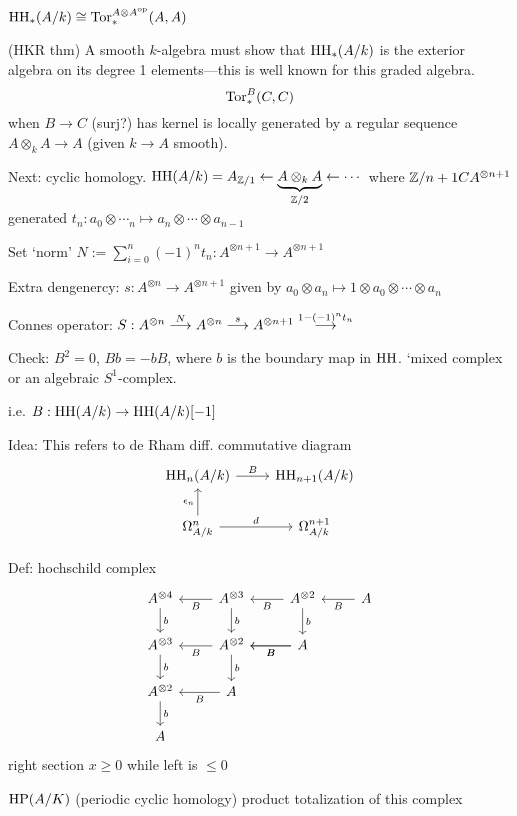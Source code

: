 \begin{cor}
$\operatorname{HH}_*(A/k) \cong \operatorname{Tor}_*^{A \otimes A^\text{op}}(A,A)$
\end{cor}



\pf (HKR thm) A smooth $k$-algebra must show that $\operatorname{HH}_*(A/k)$ is the exterior algebra on its degree 1 elements---this is well known for this graded algebra.
	\[
	\operatorname{Tor}_*^B(C,C)
	\]
when $B \to C$ (surj?) has kernel is locally generated by a regular sequence $A \otimes_k A \to A$ (given $k \to A$ smooth). 


Next: cyclic homology.
$\operatorname{HH}(A/k)= A_{\mathbb{Z}/1} \leftarrow \underbrace{A \otimes_k A}_{\mathbb{Z}/2} \leftarrow \cdots$
where $\mathbb{Z}/n+1 C A^{\otimes n+1}$
generated $t_n: a_0 \otimes \cdots_n \mapsto a_n \otimes \cdots \otimes a_{n-1}$

Set `norm' $N:= \sum_{i=0}^n (-1)^n t_n: A^{\otimes n+1} \to A^{\otimes n+1}$

Extra dengenercy: $s: A^{\otimes n} \to A^{\otimes n+1}$ given by $a_0 \otimes a_n \mapsto 1 \otimes a_0 \otimes \cdots \otimes a_n$

Connes operator: $S: A^{\otimes n} \stackrel{N}{\longrightarrow} A^{\otimes n} \stackrel{s}{\longrightarrow} A^{\otimes n+1} \stackrel{1-(-1)^n t_n}{\longrightarrow}$

Check: $B^2=0$, $Bb= -bB$, where $b$ is the boundary map in $\operatorname{HH}$. 
`mixed complex or an algebraic $S^1$-complex. 


i.e. $B: \operatorname{HH}(A/k) \to \operatorname{HH}(A/k)[-1]$

Idea: This refers to de Rham diff. commutative diagram
	\[
	\begin{tikzcd}
	\hh_n(A/k) \arrow{r}{B} & \hh_{n+1}(A/k) \\
	\Omega_{A/k}^n \arrow{u}{\epsilon_n} \arrow{r}{d} & \Omega_{A/k}^{n+1}
	\end{tikzcd}
	\]

Def: hochschild complex
	\[
	\begin{tikzcd}
	A^{\otimes 4} \arrow{d}{b} & A^{\otimes 3} \arrow{d}{b} \arrow{l}{B} & A^{\otimes 2} \arrow{d}{b} \arrow{l}{B} & A \arrow{l}{B} \\
	A^{\otimes 3} \arrow{d}{b} & A^{\otimes 2} \arrow{d}{b} \arrow{l}{B} & A \arrow{l}{B} \arrow{l}{B}  & \\
	A^{\otimes 2} \arrow{d}{b} & A \arrow{l}{B} \\
	A 
	\end{tikzcd}
	\]
right section $x \geq 0$ while left is $\leq 0$

$\operatorname{HP}(A/K)$ (periodic cyclic homology) product totalization of this complex 

